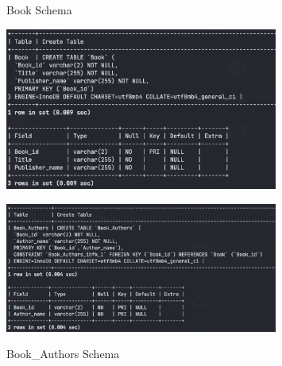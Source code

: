 \documentclass{article}
\begin{document}
\begin{figure}[h!]
    \begin{minipage}[b]{0.5\linewidth}
        \centering
        \caption{Book Schema}
        \includegraphics[width=0.8\textwidth]{images/schema-table-book.png}
        \label{fig:schema-book}
    \end{minipage}
    \hspace{0.5cm}
    \begin{minipage}[b]{0.5\linewidth}
        \centering
        \caption{Book\_Authors Schema}
        \includegraphics[width=0.8\textwidth]{images/schema-table-book-authors.png}
        \label{fig:schema-book-authors}
    \end{minipage}
\end{figure}
\end{document}
